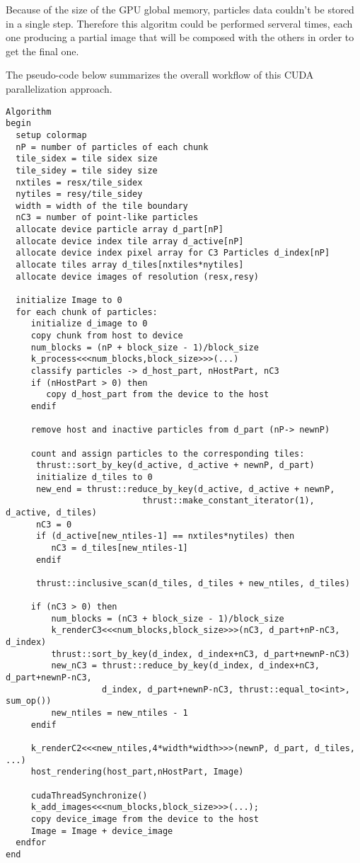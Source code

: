 \documentclass[11pt]{article}
\begin{document}
Because of the size of the GPU global memory, particles data couldn't be stored in a single step. Therefore this algoritm could be performed serveral times, each one producing a partial image that will be composed with the others in order to get the final one.

The pseudo-code below summarizes the overall workflow of this CUDA parallelization approach.

\small
\begin{verbatim}
Algorithm
begin
  setup colormap
  nP = number of particles of each chunk
  tile_sidex = tile sidex size 
  tile_sidey = tile sidey size
  nxtiles = resx/tile_sidex
  nytiles = resy/tile_sidey
  width = width of the tile boundary
  nC3 = number of point-like particles
  allocate device particle array d_part[nP]
  allocate device index tile array d_active[nP]
  allocate device index pixel array for C3 Particles d_index[nP]
  allocate tiles array d_tiles[nxtiles*nytiles]   
  allocate device images of resolution (resx,resy)
  
  initialize Image to 0
  for each chunk of particles: 
     initialize d_image to 0
     copy chunk from host to device  
     num_blocks = (nP + block_size - 1)/block_size
     k_process<<<num_blocks,block_size>>>(...)
     classify particles -> d_host_part, nHostPart, nC3 
     if (nHostPart > 0) then
        copy d_host_part from the device to the host 
     endif
 
     remove host and inactive particles from d_part (nP-> newnP) 

     count and assign particles to the corresponding tiles:
      thrust::sort_by_key(d_active, d_active + newnP, d_part)
      initialize d_tiles to 0
      new_end = thrust::reduce_by_key(d_active, d_active + newnP, 
                           thrust::make_constant_iterator(1), d_active, d_tiles)
      nC3 = 0
      if (d_active[new_ntiles-1] == nxtiles*nytiles) then
         nC3 = d_tiles[new_ntiles-1]
      endif

      thrust::inclusive_scan(d_tiles, d_tiles + new_ntiles, d_tiles)

     if (nC3 > 0) then
         num_blocks = (nC3 + block_size - 1)/block_size
         k_renderC3<<<num_blocks,block_size>>>(nC3, d_part+nP-nC3, d_index)
         thrust::sort_by_key(d_index, d_index+nC3, d_part+newnP-nC3)
         new_nC3 = thrust::reduce_by_key(d_index, d_index+nC3, d_part+newnP-nC3, 
                   d_index, d_part+newnP-nC3, thrust::equal_to<int>, sum_op()) 
         new_ntiles = new_ntiles - 1 
     endif

     k_renderC2<<<new_ntiles,4*width*width>>>(newnP, d_part, d_tiles, ...)
     host_rendering(host_part,nHostPart, Image) 
 
     cudaThreadSynchronize()
     k_add_images<<<num_blocks,block_size>>>(...);
     copy device_image from the device to the host
     Image = Image + device_image
  endfor
end
\end{verbatim}
\end{document}
